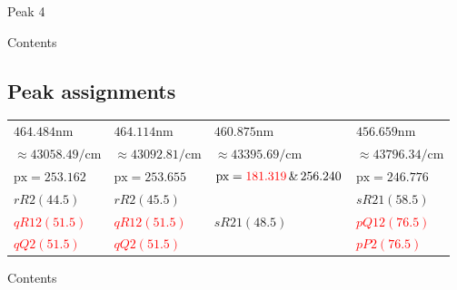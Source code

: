 \documentclass[aspectratio=43,scheme=plain]{ctexbeamer}
\begin{document}
\begin{frame}{Peak 4}
\begin{figure}[H]
\end{figure}
\end{frame}
\begin{frame}{Contents}
\end{frame}
\subsection{Peak assignments}
\begin{frame}{\insertsubsection}
			\begin{table}
			\centering  	 
			\scriptsize
			\begin{tabularx}{0.97\textwidth}{llll}    
				\toprule   
				$464.484 \unit{\nano \meter}$ &$464.114\unit{\nano \meter}$&$460.875 \unit{\nano \meter}$& $456.659 \unit{\nano \meter}$\\
				$\approx43058.49 \unit{\per \centi \meter}$ &   $\approx43092.81\unit{\per \centi \meter}$ &  $\approx 43395.69\unit{\per \centi \meter}$ & $\approx 43796.34\unit{\per \centi \meter} $\\
				\midrule   
				$\text{px}=253.162$ & $\text{px}=253.655$ & $\text{px}=\textcolor{red}{181.319}\,\&\,256.240$ &$ \text{px}=246.776$ \\  
				\midrule 
				$rR2\left( 44.5\right) $ & $rR2\left( 45.5\right) $ &  &$sR21\left( 58.5\right) $\\  
				\textcolor{red}{$qR12\left( 51.5\right) $} & \textcolor{red}{$qR12 \left( 51.5\right) $} &  $sR21\left( 48.5\right) $ & \textcolor{red}{$pQ12 \left( 76.5\right) $} \\ 
				\textcolor{red}{$qQ2\left(  51.5\right) $} & \textcolor{red}{$qQ2\left(  51.5\right) $} &   & \textcolor{red}{$pP2\left(  76.5\right) $} \\ 
				\bottomrule    
			\end{tabularx}%
		\end{table}%
	\end{frame}
	\begin{frame}{Contents}
	\end{frame}
\end{document}
